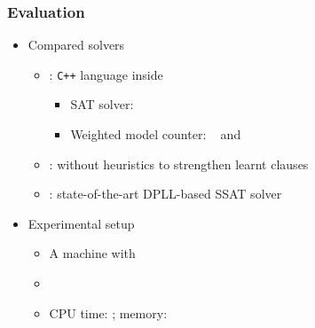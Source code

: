 \renewcommand{\nrandom}{\num{700}}
\renewcommand{\napplication}{\num{212}}
\newcommand{\ntoilet}{\num{77}}
\newcommand{\nmaxcount}{\num{26}}
\newcommand{\nsandcastle}{\num{25}}
\newcommand{\nconformant}{\num{24}}
\newcommand{\nmpec}{\num{60}}

\begin{frame}
    \frametitle{Evaluation}
    \begin{itemize}
        \item Compared solvers
              \pause
              \begin{itemize}
                  \item \erssat: \texttt{C++} language inside~\abc~\cite{ABC}
                        \pause
                        \begin{itemize}
                            \item SAT solver: ~\cite{Een2003Solver}
                                  \pause
                            \item Weighted model counter: \cachet~\cite{Sang2004} and \cudd~\cite{Darwiche2002KnowledgeCompilation}
                                  \pause
                        \end{itemize}
                  \item \erssatb: \erssat without heuristics to strengthen learnt clauses
                        \pause
                  \item \dcssat: state-of-the-art DPLL-based SSAT solver
                        \pause
              \end{itemize}
        \item Experimental setup
              \pause
              \begin{itemize}
                  \item A machine with~\machineSpec
                        \pause
                  \item \osInfo
                        \pause
                  \item CPU time: \timelimit; memory: \memlimit
              \end{itemize}
    \end{itemize}
\end{frame}

